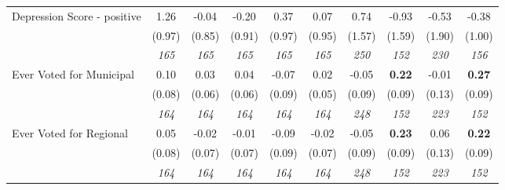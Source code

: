\begin{tabular}{l c c c c c c c c c}
Depression Score - positive & 1.26 & -0.04 & -0.20 & 0.37 & 0.07 & 0.74 & -0.93 & -0.53 & -0.38 \\
& (0.97) & (0.85) & (0.91) & (0.97) & (0.95) & (1.57) & (1.59) & (1.90) & (1.00) \\
& \textit{ 165 } & \textit{ 165 } & \textit{ 165 } & \textit{ 165 } & \textit{ 165 } & \textit{ 250 } & \textit{ 152 } & \textit{ 230 } & \textit{ 156 } \\
Ever Voted for Municipal & 0.10 & 0.03 & 0.04 & -0.07 & 0.02 & -0.05 & \textbf{0.22} & -0.01 & \textbf{0.27} \\
& (0.08) & (0.06) & (0.06) & (0.09) & (0.05) & (0.09) & (0.09) & (0.13) & (0.09) \\
& \textit{ 164 } & \textit{ 164 } & \textit{ 164 } & \textit{ 164 } & \textit{ 164 } & \textit{ 248 } & \textit{ 152 } & \textit{ 223 } & \textit{ 152 } \\
Ever Voted for Regional & 0.05 & -0.02 & -0.01 & -0.09 & -0.02 & -0.05 & \textbf{0.23} & 0.06 & \textbf{0.22} \\
& (0.08) & (0.07) & (0.07) & (0.09) & (0.07) & (0.09) & (0.09) & (0.13) & (0.09) \\
& \textit{ 164 } & \textit{ 164 } & \textit{ 164 } & \textit{ 164 } & \textit{ 164 } & \textit{ 248 } & \textit{ 152 } & \textit{ 223 } & \textit{ 152 } \\
\bottomrule
\end{tabular}
